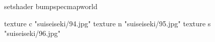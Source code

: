 setshader bumpspecmapworld

    texture c "suiseiseki/94.jpg"
    texture n "suiseiseki/95.jpg"
    texture s "suiseiseki/96.jpg"
